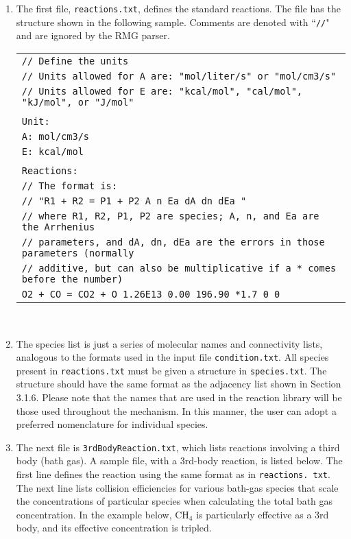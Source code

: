 \documentclass[12pt,letterpaper]{article}
\begin{document}
\begin{enumerate}

\item The first file, \texttt{reactions.txt}, defines the standard reactions. The file has
the structure shown in the following sample. Comments are denoted
with ``\texttt{//}" and are ignored by the RMG parser.\\

{\footnotesize{
\begin{tabular}{l}
\texttt{// Define the units} \\
\texttt{// Units allowed for A are: "mol/liter/s" or "mol/cm3/s"} \\
\texttt{// Units allowed for E are: "kcal/mol", "cal/mol", "kJ/mol", or "J/mol"} \\
\\
\texttt{Unit:} \\
\texttt{A: mol/cm3/s}\\
\texttt{E: kcal/mol}\\
\\
\texttt{Reactions:}\\
\texttt{// The format is:}\\
\texttt{// "R1 + R2 = P1 + P2 A n Ea dA dn dEa "}\\
\texttt{// where R1, R2, P1, P2 are species; A, n, and Ea are the Arrhenius }\\
\texttt{// parameters, and dA, dn, dEa are the errors in those parameters (normally} \\
\texttt{// additive, but can also be multiplicative if a * comes before the number) }\\
\texttt{O2 + CO = CO2 + O 1.26E13 0.00 196.90 *1.7 0 0 }\\
\end{tabular}\\
}}

\item The species list is just a series of molecular names and connectivity
lists, analogous to the formats used in the input file \texttt{condition.txt}. All
species present in \texttt{reactions.txt} must be given a structure in \texttt{species.txt}.
The structure should have the same format as the adjacency list shown
in Section 3.1.6. Please note that the names that are used in the
reaction library will be those used throughout the mechanism. In this
manner, the user can adopt a preferred nomenclature for individual
species.\\

\item The next file is \texttt{3rdBodyReaction.txt}, which lists reactions involving a
third body (bath gas). A sample file, with a 3rd-body reaction, is listed
below. The first line defines the reaction using the same format as in \texttt{reactions.
txt}. The next line lists collision efficiencies for various bath-gas
species that scale the concentrations of particular species when calculating
the total bath gas concentration. In the example below, CH$_4$ is
particularly effective as a 3rd body, and its effective concentration is
tripled.\\


\end{enumerate}
\end{document}
